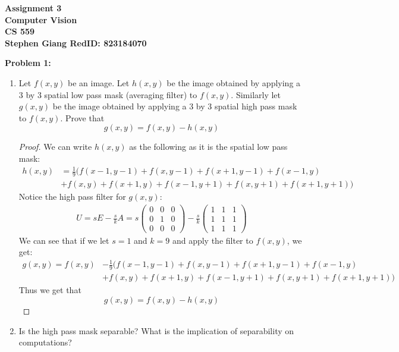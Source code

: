 \documentclass[11pt]{article}
\newcommand{\skipline}{\vspace{\baselineskip}}
\newenvironment{problem}[1]{\textbf{Problem #1: }}{\newpage}
\begin{document}
	
	\begin{center}
		\textbf{Assignment 3} \\
		\textbf{Computer Vision} \\
		\textbf{CS 559} \\
		\textbf{Stephen Giang RedID: 823184070} \\
		\skipline \skipline
	\end{center}

	\begin{problem}{1}
		\begin{enumerate}[label = (\alph*)]
			\item Let $f(x,y)$ be an image.  Let $h(x,y)$ be the image obtained by applying a 3 by 3 spatial low pass mask (averaging filter) to $f(x,y)$.  Similarly let $g(x,y)$ be the image obtained by applying a 3 by 3 spatial high pass mask to $f(x,y)$.  Prove that
			\[g(x,y) = f(x,y) - h(x,y)\]
			\begin{proof}
				We can write $h(x,y)$ as the following as it is the spatial low pass mask:
				\begin{align*}
					h(x,y) &= \frac{1}{9} \bigg( f(x-1,y-1) + f(x,y-1) + f(x+1,y-1) + f(x-1,y)  \\
					&+ f(x,y) + f(x+1,y) + f(x-1,y + 1) + f(x,y + 1) + f(x+1,y + 1) \bigg)
				\end{align*}
				Notice the high pass filter for $g(x,y)$:
				\begin{align*}
					U = sE - \frac{s}{k}A = s\begin{pmatrix}
						0 & 0 & 0 \\ 0 & 1 & 0 \\ 0 & 0 & 0
					\end{pmatrix} - \frac{s}{k}\begin{pmatrix}
						1 & 1 & 1 \\ 1 & 1 & 1 \\ 1 & 1 & 1
					\end{pmatrix}
				\end{align*}
				We can see that if we let $s = 1$ and $k = 9$ and apply the filter to $f(x,y)$, we get:
				\begin{align*}
					g(x,y) = f(x,y) &- \frac{1}{9} \bigg( f(x-1,y-1) + f(x,y-1) + f(x+1,y-1) + f(x-1,y)  \\
					&+ f(x,y) + f(x+1,y) + f(x-1,y + 1) + f(x,y + 1) + f(x+1,y + 1) \bigg)
				\end{align*}
				Thus we get that
				\[g(x,y) = f(x,y) - h(x,y)\]
			\end{proof}
			\skipline
			\item Is the high pass mask separable? What is the implication of separability on computations?

\end{enumerate}
\end{problem}
\end{document}
